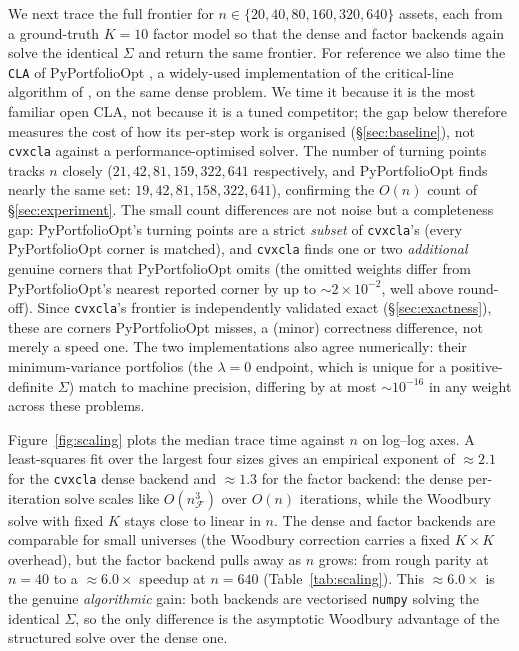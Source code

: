 \documentclass[11pt]{article}
\newcommand{\Sig}{\Sigma}
\newcommand{\F}{\mathcal{F}}        %
\begin{document}
We next trace the full frontier for $n \in \{20, 40, 80, 160, 320, 640\}$ assets,
each from a ground-truth $K = 10$ factor model so that the dense and factor
backends again solve the identical $\Sig$ and return the same frontier. For
reference we also time the \texttt{CLA} of PyPortfolioOpt \citep{pyportfolioopt},
a widely-used implementation of the critical-line algorithm of
\citet{bailey2013}, on the same dense problem. We time it because it is the most
familiar open CLA, not because it is a tuned competitor; the gap below therefore
measures the cost of how its per-step work is organised (\S\ref{sec:baseline}), not
\texttt{cvxcla} against a performance-optimised solver. The number of turning points tracks $n$ closely
($21, 42, 81, 159, 322, 641$ respectively, and PyPortfolioOpt finds nearly the same
set: $19, 42, 81, 158, 322, 641$), confirming the $O(n)$ count of
\S\ref{sec:experiment}. The small count differences are not noise but a completeness
gap: PyPortfolioOpt's turning points are a strict \emph{subset} of \texttt{cvxcla}'s
(every PyPortfolioOpt corner is matched), and \texttt{cvxcla} finds one or two
\emph{additional} genuine corners that PyPortfolioOpt omits (the omitted weights
differ from PyPortfolioOpt's nearest reported corner by up to $\sim\!2\times10^{-2}$,
well above round-off). Since \texttt{cvxcla}'s frontier is independently validated
exact (\S\ref{sec:exactness}), these are corners PyPortfolioOpt misses, a (minor)
correctness difference, not merely a speed one. The two
implementations also agree numerically: their minimum-variance portfolios (the
$\lambda = 0$ endpoint, which is unique for a positive-definite $\Sig$) match to
machine precision, differing by at most $\sim\!10^{-16}$ in any weight across these
problems.

Figure~\ref{fig:scaling} plots the median trace time against $n$ on log--log
axes. A least-squares fit over the largest four sizes gives an empirical exponent
of $\approx 2.1$ for the \texttt{cvxcla} dense backend and $\approx 1.3$ for the
factor backend: the dense per-iteration solve scales like $O(n_\F^3)$ over $O(n)$
iterations, while the Woodbury solve with fixed $K$ stays close to linear in $n$.
The dense and factor backends are comparable for small universes (the Woodbury
correction carries a fixed $K\times K$ overhead), but the factor backend pulls
away as $n$ grows: from rough parity at $n=40$ to a $\approx 6.0\times$ speedup
at $n=640$ (Table~\ref{tab:scaling}). This $\approx 6.0\times$ is the genuine
\emph{algorithmic} gain: both backends are vectorised \texttt{numpy} solving the
identical $\Sig$, so the only difference is the asymptotic Woodbury advantage of
the structured solve over the dense one.
\end{document}
